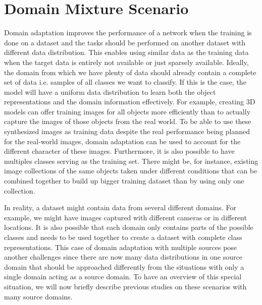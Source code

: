 \section{Domain Mixture Scenario} \label{sec:domainMixture}
Domain adaptation improves the performance of a network when the training is done on a dataset and the tasks should be performed on another dataset with different data distribution. This enables using similar data as the training data when the target data is entirely not available or just sparsely available. Ideally, the domain from which we have plenty of data should already contain a complete set of data i.e. samples of all classes we want to classify. If this is the case, the model will have a uniform data distribution to learn both the object representations and the domain information effectively. For example, creating 3D models can offer training images for all objects more efficiently than to actually capture the images of those objects from the real world. To be able to use these synthesized images as training data despite the real performance being planned for the real-world images, domain adaptation can be used to account for the different character of these images. Furthermore, it is also possible to have multiples classes serving as the training set. There might be, for instance, existing image collections of the same objects taken under different conditions that can be combined together to build up bigger training dataset than by using only one collection. 

In reality, a dataset might contain data from several different domains. For example, we might have images captured with different cameras or in different locations. It is also possible that each domain only contains parts of the possible classes and needs to be used together to create a dataset with complete class representations. This case of domain adaptation with multiple sources pose another challenges since there are now many data distributions in one source domain that should be approached differently from the situations with only a single domain acting as a source domain. To have an overview of this special situation, we will now briefly describe previous studies on these scenarios with many source domains.

